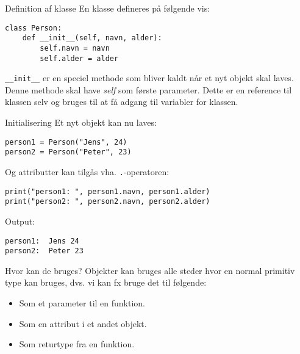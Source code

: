 \begin{frame}[fragile]{Definition af klasse}
	En klasse defineres på følgende vis:
		\begin{lstlisting}[style=python]
class Person:
	def __init__(self, navn, alder):
		self.navn = navn
		self.alder = alder
	\end{lstlisting}
	\texttt{\_\_init\_\_} er en speciel methode som bliver kaldt når et nyt objekt skal laves. Denne methode skal have \emph{self} som første parameter. Dette er en reference til klassen selv og bruges til at få adgang til variabler for klassen.
\end{frame}

\begin{frame}[fragile]{Initialisering}
	Et nyt objekt kan nu laves:
		\begin{lstlisting}[style=python]
person1 = Person("Jens", 24)
person2 = Person("Peter", 23)
	\end{lstlisting}
	Og attributter kan tilgås vha. \texttt{.}-operatoren:
	\begin{lstlisting}[style=python]
print("person1: ", person1.navn, person1.alder)
print("person2: ", person2.navn, person2.alder)
	\end{lstlisting}
	Output:
	\begin{lstlisting}[style=python]
person1:  Jens 24
person2:  Peter 23
	\end{lstlisting}
\end{frame}

\begin{frame}{Hvor kan de bruges?}
	Objekter kan bruges alle steder hvor en normal primitiv type kan bruges, dvs. vi kan fx bruge det til følgende:
	\begin{itemize}
		\item Som et parameter til en funktion.
		\item Som en attribut i et andet objekt.
		\item Som returtype fra en funktion.
	\end{itemize}
\end{frame}

